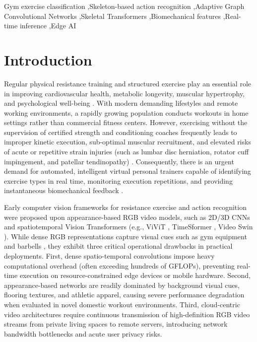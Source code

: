 \documentclass[preprint,12pt]{elsarticle}
\begin{document}
\begin{frontmatter}
\begin{abstract}
\end{abstract}

\begin{keyword}
Gym exercise classification \sep Skeleton-based action recognition \sep Adaptive Graph Convolutional Networks \sep Skeletal Transformers \sep Biomechanical features \sep Real-time inference \sep Edge AI
\end{keyword}

\end{frontmatter}

\section{Introduction}

Regular physical resistance training and structured exercise play an essential role in improving cardiovascular health, metabolic longevity, muscular hypertrophy, and psychological well-being \cite{schoenfeld2010}.
With modern demanding lifestyles and remote working environments, a rapidly growing population conducts workouts in home settings rather than commercial fitness centers. 
However, exercising without the supervision of certified strength and conditioning coaches frequently leads to improper kinetic execution, sub-optimal muscular recruitment, and elevated risks of acute or repetitive strain injuries (such as lumbar disc herniation, rotator cuff impingement, and patellar tendinopathy) \cite{riccio2024}. 
Consequently, there is an urgent demand for automated, intelligent virtual personal trainers capable of identifying exercise types in real time, monitoring execution repetitions, and providing instantaneous biomechanical feedback \cite{garciadevilla2022}.

Early computer vision frameworks for resistance exercise and action recognition were proposed upon appearance-based RGB video models, such as 2D/3D CNNs \cite{donahue2015,carreira2017,feichtenhofer2019} and spatiotemporal Vision Transformers (e.g., ViViT \cite{arnab2021}, TimeSformer \cite{bertasius2021}, Video Swin \cite{liu2022video}). 
While dense RGB representations capture visual cues such as gym equipment and barbells \cite{ng2015}, they exhibit three critical operational drawbacks in practical deployments.
First, dense spatio-temporal convolutions impose heavy computational overhead (often exceeding hundreds of GFLOPs), preventing real-time execution on resource-constrained edge devices or mobile hardware. 
Second, appearance-based networks are readily dominated by background visual cues, flooring textures, and athletic apparel, causing severe performance degradation when evaluated in novel domestic workout environments. 
Third, cloud-centric video architectures require continuous transmission of high-definition RGB video streams from private living spaces to remote servers, introducing network bandwidth bottlenecks and acute user privacy risks.
\end{document}
